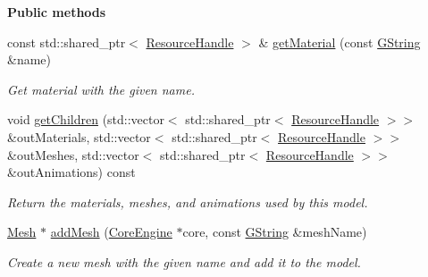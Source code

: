 \begin{Indent}\textbf{ Public methods}\par
\begin{DoxyCompactItemize}
\item 
\mbox{\label{classrev_1_1_model_a471f1534606eb09eb5b192b278cb1dae}} 
const std\+::shared\+\_\+ptr$<$ \mbox{\hyperlink{classrev_1_1_resource_handle}{Resource\+Handle}} $>$ \& \mbox{\hyperlink{classrev_1_1_model_a471f1534606eb09eb5b192b278cb1dae}{get\+Material}} (const \mbox{\hyperlink{classrev_1_1_g_string}{G\+String}} \&name)
\begin{DoxyCompactList}\small\item\em Get material with the given name. \end{DoxyCompactList}\item 
\mbox{\label{classrev_1_1_model_a9da5a506a194310f2a00d180e5f34a00}} 
void \mbox{\hyperlink{classrev_1_1_model_a9da5a506a194310f2a00d180e5f34a00}{get\+Children}} (std\+::vector$<$ std\+::shared\+\_\+ptr$<$ \mbox{\hyperlink{classrev_1_1_resource_handle}{Resource\+Handle}} $>$$>$ \&out\+Materials, std\+::vector$<$ std\+::shared\+\_\+ptr$<$ \mbox{\hyperlink{classrev_1_1_resource_handle}{Resource\+Handle}} $>$$>$ \&out\+Meshes, std\+::vector$<$ std\+::shared\+\_\+ptr$<$ \mbox{\hyperlink{classrev_1_1_resource_handle}{Resource\+Handle}} $>$$>$ \&out\+Animations) const
\begin{DoxyCompactList}\small\item\em Return the materials, meshes, and animations used by this model. \end{DoxyCompactList}\item 
\mbox{\label{classrev_1_1_model_ad18633701ce36868988f084d5c8575a6}} 
\mbox{\hyperlink{classrev_1_1_mesh}{Mesh}} $\ast$ \mbox{\hyperlink{classrev_1_1_model_ad18633701ce36868988f084d5c8575a6}{add\+Mesh}} (\mbox{\hyperlink{classrev_1_1_core_engine}{Core\+Engine}} $\ast$core, const \mbox{\hyperlink{classrev_1_1_g_string}{G\+String}} \&mesh\+Name)
\begin{DoxyCompactList}\small\item\em Create a new mesh with the given name and add it to the model. \end{DoxyCompactList}\item 
\mbox{\label{classrev_1_1_model_a7f540fb69a76cc8e9d36e4317f954668}} 
$$
\end{DoxyCompactItemize}
\end{Indent}
